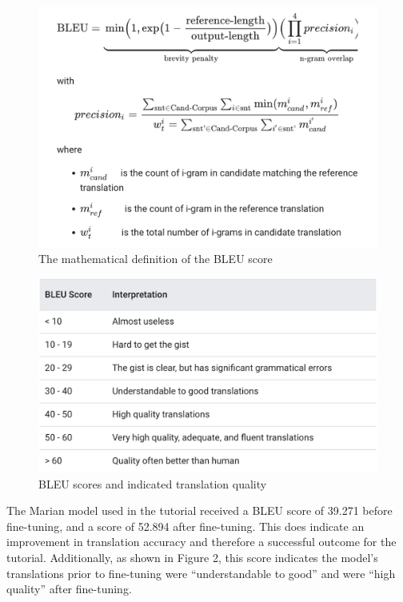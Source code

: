 \documentclass[10pt,twocolumn]{article}
\begin{document}
\begin{figure}
    \centering
    \includegraphics[width=.95\linewidth]{BLEUMathematicalDefinition.PNG}
    \caption{
        The mathematical definition of the BLEU score
    }
    \label{fig:first-page}
\end{figure}

\begin{figure}
    \centering
    \includegraphics[width=.95\linewidth]{BLEUInterpretation.PNG}
    \caption{
        BLEU scores and indicated translation quality
    }
    \label{fig:first-page}
\end{figure}


The Marian model used in the tutorial received a BLEU score of 39.271 before fine-tuning, and a score of 52.894 after fine-tuning. This does indicate an improvement in translation accuracy and therefore a successful outcome for the tutorial. Additionally, as shown in Figure 2, this score indicates the model's translations prior to fine-tuning were ``understandable to good'' and were ``high quality'' after fine-tuning. 
\end{document}
